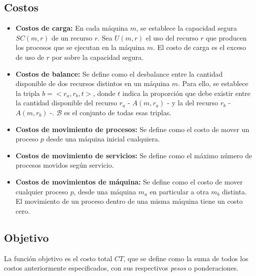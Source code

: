 \documentclass[../informe2.tex]{subfiles}
\begin{document}
\subsection{Costos}
\begin{itemize}
	\item \textbf{Costos de carga:} En cada máquina $m$, se establece la capacidad segura $SC(m,r)$ de un recurso $r$. Sea $U(m,r)$ el uso del recurso $r$ que producen los procesos que se ejecutan en la máquina $m$. El costo de carga es el exceso de uso de $r$ por sobre la capacidad segura.

	\item \textbf{Costos de balance:} Se define como el desbalance entre la cantidad disponible de dos recursos distintos en un máquina $m$. Para ello, se establece la tripla $b = <r_a,r_b,t>$, donde $t$ indica la proporción que debe existir entre la cantidad disponible del recurso $r_a$ - $A(m,r_a)$ - y la del recurso $r_b$ - $A(m,r_b)$ -. $\mathcal{B}$ es el conjunto de todas esas triplas.

	\item \textbf{Costos de movimiento de procesos:} Se define como el costo de mover un proceso $p$ desde una máquina inicial cualquiera.

	\item \textbf{Costos de movimiento de servicios:} Se define como el máximo número de procesos movidos según servicio.

	\item \textbf{Costos de movimientos de máquina:} Se define como el costo de mover cualquier proceso $p$, desde una máquina $m_a$ en particular a otra $m_b$ distinta. El movimiento de un proceso dentro de una misma máquina tiene un costo cero.

\end{itemize}

\subsection{Objetivo}
La función objetivo es el costo total $CT$, que se define como la suma de todos los costos anteriormente especificados, con sus respectivos \textit{pesos} o ponderaciones. \\
\end{document}
